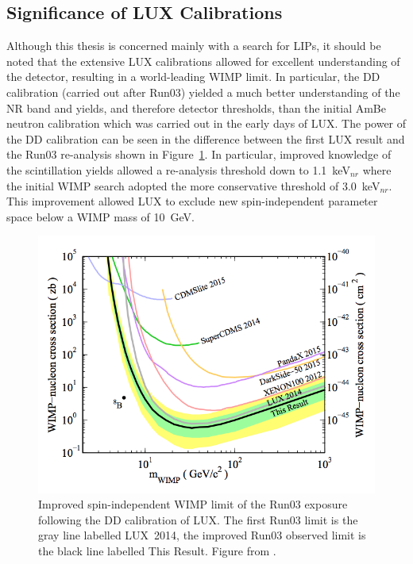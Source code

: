 

\FloatBarrier
\subsection{Significance of LUX Calibrations}
Although this thesis is concerned mainly with a search for \ac{LIP}s, it should be noted that the extensive \ac{LUX} calibrations allowed for excellent understanding of the detector, resulting in a world-leading \ac{WIMP} limit. In particular, the \ac{DD} calibration (carried out after Run03) yielded a much better understanding of the \ac{NR} band and yields, and therefore detector thresholds, than the initial AmBe neutron calibration which was carried out in the early days of \ac{LUX}. The power of the \ac{DD} calibration can be seen in the difference between the first \ac{LUX} result \cite{LUXFirstResults} and the Run03 re-analysis \cite{LUXReanalysis} shown in Figure~\ref{fig:lux_reanalysis}. In particular, improved knowledge of the scintillation yields allowed a re-analysis threshold down to 1.1~keV$_{nr}$ where the initial \ac{WIMP} search adopted the more conservative threshold of 3.0~keV$_{nr}$. This improvement allowed \ac{LUX} to exclude new spin-independent parameter space below a \ac{WIMP} mass of 10~GeV. 


\begin{figure}[htbp]
\begin{center}
\includegraphics[width=\textwidth]{figures/lux/lux_reanalysis.png}
\caption{Improved spin-independent \acs{WIMP} limit of the Run03 exposure following the \acs{DD} calibration of \acs{LUX}. The first Run03 limit is the gray line labelled LUX~2014, the improved Run03 observed limit is the black line labelled This Result.  Figure from \cite{LUXReanalysis}.}
\label{fig:lux_reanalysis}
\end{center}
\end{figure}

